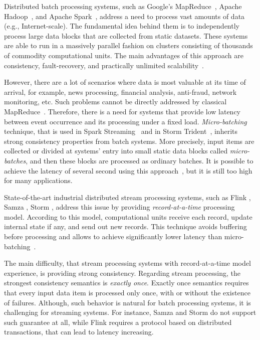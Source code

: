 
\label {fs-intro-seciton}

Distributed batch processing systems, such as Google's MapReduce~\cite{Dean:2008:MSD:1327452.1327492}, Apache Hadoop~\cite{hadoop2009hadoop}, and Apache Spark~\cite{Zaharia:2016:ASU:3013530.2934664}, address a need to process vast amounts of data (e.g., Internet-scale). The fundamental idea behind them is to independently process large data blocks that are collected from static datasets. These systems are able to run in a massively parallel fashion on clusters consisting of thousands of commodity computational units. The main advantages of this approach are consistency, fault-recovery, and practically unlimited scalability~\cite{borthakur2011apache}.

However, there are a lot of scenarios where data is most valuable at its time of arrival, for example, news processing, financial analysis, anti-fraud, network monitoring, etc. Such problems cannot be directly addressed by classical MapReduce~\cite{Doulkeridis:2014:SLA:2628707.2628782}. Therefore, there is a need for systems that provide low latency between event occurrence and its processing under a fixed load. {\it Micro-batching} technique, that is used in Spark Streaming~\cite{Zaharia:2012:DSE:2342763.2342773} and in Storm Trident~\cite{apache:storm:trident}, inherits strong consistency properties from batch systems. More precisely, input items are collected or divided at systems' entry into small static data blocks called {\it micro-batches}, and then these blocks are processed as ordinary batches. It is possible to achieve the latency of several second using this approach~\cite{7530084, 7474816}, but it is still too high for many applications.

State-of-the-art industrial distributed stream processing systems, such as Flink \cite{carbone2015apache}, Samza \cite{Noghabi:2017:SSS:3137765.3137770}, Storm \cite{apache:storm}, address this issue by providing {\it record-at-a-time} processing model. According to this model, computational units receive each record, update internal state if any, and send out new records. This technique avoids buffering before processing and allows to achieve significantly lower latency than micro-batching~\cite{7530084}.

The main difficulty, that stream processing systems with record-at-a-time model experience, is providing strong consistency. Regarding stream processing, the strongest consistency semantics is {\it exactly once}. Exactly once semantics requires that every input data item is processed only once, with or without the existence of failures. Although, such behavior is natural for batch processing systems, it is challenging for streaming systems. For instance, Samza and Storm do not support such guarantee at all, while Flink requires a protocol based on distributed transactions, that can lead to latency increasing.


